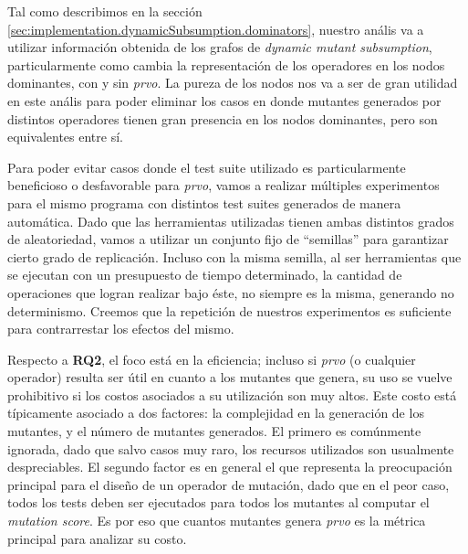 Tal como describimos en la secci\'on \ref{sec:implementation.dynamicSubsumption.dominators}, nuestro an\'alis va a utilizar informaci\'on obtenida de los grafos de \emph{dynamic mutant subsumption}, particularmente como cambia la representaci\'on de los operadores en los nodos dominantes, con y sin \emph{prvo}. La pureza de los nodos nos va a ser de gran utilidad en este an\'alis para poder eliminar los casos en donde mutantes generados por distintos operadores tienen gran presencia en los nodos dominantes, pero son equivalentes entre s\'i.

Para poder evitar casos donde el test suite utilizado es particularmente beneficioso o desfavorable para \emph{prvo}, vamos a realizar m\'ultiples experimentos para el mismo programa con distintos test suites generados de manera autom\'atica. Dado que las herramientas utilizadas tienen ambas distintos grados de aleatoriedad, vamos a utilizar un conjunto fijo de ``semillas'' para garantizar cierto grado de replicaci\'on. Incluso con la misma semilla, al ser herramientas que se ejecutan con un presupuesto de tiempo determinado, la cantidad de operaciones que logran realizar bajo \'este, no siempre es la misma, generando no determinismo. Creemos que la repetici\'on de nuestros experimentos es suficiente para contrarrestar los efectos del mismo.

Respecto a \textbf{RQ2}, el foco est\'a en la eficiencia; incluso si \emph{prvo} (o cualquier operador) resulta ser \'util en cuanto a los mutantes que genera, su uso se vuelve prohibitivo si los costos asociados a su utilizaci\'on son muy altos. Este costo est\'a t\'ipicamente asociado a dos factores: la complejidad en la generaci\'on de los mutantes, y el n\'umero de mutantes generados. El primero es com\'unmente ignorada, dado que salvo casos muy raro, los recursos utilizados son usualmente despreciables. El segundo factor es en general el que representa la preocupaci\'on principal para el dise\~no de un operador de mutaci\'on, dado que en el peor caso, todos los tests deben ser ejecutados para todos los mutantes al computar el \emph{mutation score}. Es por eso que cuantos mutantes genera \emph{prvo} es la m\'etrica principal para analizar su costo.


